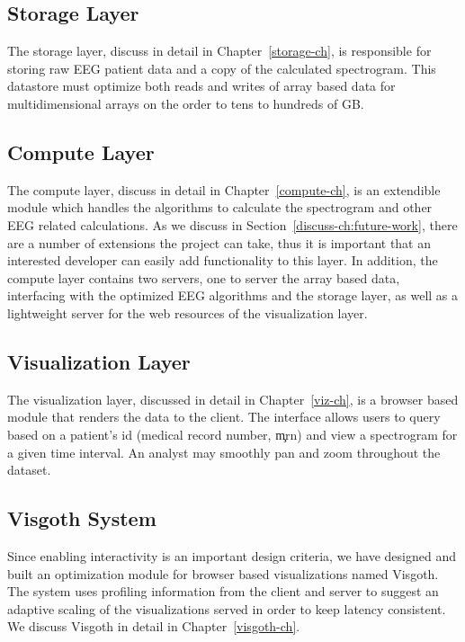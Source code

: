 \subsection{Storage Layer}

The storage layer, discuss in detail in Chapter~\ref{storage-ch}, is
responsible for storing raw EEG patient data and a copy of the calculated
spectrogram. This datastore must optimize both reads and writes of array based
data for multidimensional arrays on the order to tens to hundreds of GB.

\subsection{Compute Layer}

The compute layer, discuss in detail in Chapter~\ref{compute-ch}, is an
extendible module which handles the algorithms to calculate the spectrogram and
other EEG related calculations. As we discuss in
Section~\ref{discuss-ch:future-work}, there are a number of extensions the
project can take, thus it is important that an interested developer can easily
add functionality to this layer. In addition, the compute layer contains two
servers, one to server the array based data, interfacing with the optimized EEG
algorithms and the storage layer, as well as a lightweight server for the web
resources of the visualization layer.

\subsection{Visualization Layer}

The visualization layer, discussed in detail in Chapter~\ref{viz-ch}, is a browser
based module that renders the data to the client. The interface allows users to
query based on a patient's id (medical record number, \c{mrn}) and view a spectrogram
for a given time interval. An analyst may smoothly pan and zoom throughout the dataset.

\subsection{Visgoth System}

Since enabling interactivity is an important design criteria, we have designed
and built an optimization module for browser based visualizations named
Visgoth. The system uses profiling information from the client and server to
suggest an adaptive scaling of the visualizations served in order to keep
latency consistent. We discuss Visgoth in detail in Chapter~\ref{visgoth-ch}.


